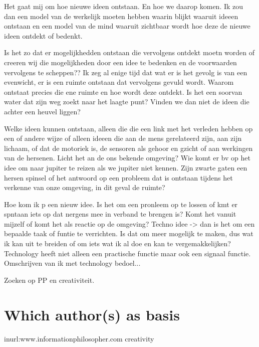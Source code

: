 \documentclass[a4paper]{Thesis}
\begin{document}
	
	Het gaat mij om hoe nieuwe ideen ontstaan. En hoe we daarop komen.
	Ik zou dan een model van de werkelijk moeten hebben waarin blijkt waaruit ideeen ontstaan en een model van de mind waaruit zichtbaar wordt hoe deze de nieuwe ideen ontdekt of bedenkt. 
	
	
	Is het zo dat er mogelijkhedden ontstaan die vervolgens ontdekt moetn worden of creeren wij die mogelijkheden door een idee te bedenken en de voorwaarden vervolgens te scheppen??
	Ik zeg al enige tijd dat wat er is het gevolg is van een evenwicht, er is een ruimte ontstaan dat vervolgens gevuld wordt.
	Waarom ontstaat precies die ene ruimte en hoe wordt deze ontdekt. Is het een soorvan water dat zijn weg zoekt naar het laagte punt? Vinden we dan niet de ideen die achter een heuvel liggen?
	
	
	Welke ideen kunnen ontstaan, alleen die die een link met het verleden hebben op een of andere wijze of alleen ideeen die aan de mens gerelateerd zijn, aan zijn lichaam, of dat de motoriek is, de sensoren als gehoor en gzicht of aan werkingen van de hersenen. Licht het an de ons bekende omgeving? Wie komt er bv op het idee om naar jupiter te reizen als we jupiter niet kennen. Zijn zwarte gaten een hersen spinsel of het antwoord op een probleem dat is ontstaan tijdens het verkenne van onze omgeving, in dit geval de ruimte?
	
	Hoe kom ik p een nieuw idee. Is het om een pronleem op te lossen of kmt er spntaan iets op dat nergens mee in verband te brengen is?
	Komt het vanuit mijzelf of komt het als reactie op de omgeving?
	Techno idee -> dan is het om een bepaalde taak of funtie te verrichten. Is dat om meer mogelijk te maken, dus wat ik kan uit te breiden of om iets wat ik al doe en kan te vergemakkelijken? Technology heeft niet alleen een practische functie maar ook een signaal functie.
	Omschrijven van ik met technology bedoel...
	
	Zoeken op PP en creativiteit.

\section{Which author(s) as basis}
	inurl:www.informationphilosopher.com creativity
	
\end{document}

